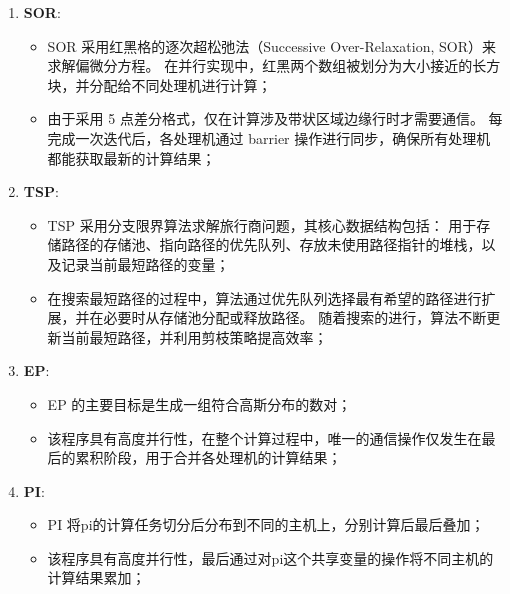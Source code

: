 {\begin{enumerate}[leftmargin=1em, align=left]
\begin{itemize}[leftmargin=*, nosep]
                  \item IS 是一个基于“桶排序”算法的整数排序程序。
                        它将 key 均匀分配到各个处理机，每个处理机维护一个私有“桶”，同时所有处理机共享一个公用“桶”；
                  \item 排序过程包括三个主要步骤：首先，每个处理机统计其私有“桶”中 key 的数量；
                        然后，在锁保护的临界区内，将这些计数累加到公用“桶”中；最后，根据公用“桶”中的信息构造出一个有序数组；
              \end{itemize}
        \item \textbf{SOR}:
              \begin{itemize}[leftmargin=*, nosep]
                  \item SOR 采用红黑格的逐次超松弛法（Successive Over-Relaxation, SOR）来求解偏微分方程。
                        在并行实现中，红黑两个数组被划分为大小接近的长方块，并分配给不同处理机进行计算；
                  \item 由于采用 5 点差分格式，仅在计算涉及带状区域边缘行时才需要通信。
                        每完成一次迭代后，各处理机通过 barrier 操作进行同步，确保所有处理机都能获取最新的计算结果；
              \end{itemize}
        \item \textbf{TSP}:
              \begin{itemize}[leftmargin=*, nosep]
                  \item TSP 采用分支限界算法求解旅行商问题，其核心数据结构包括：
                        用于存储路径的存储池、指向路径的优先队列、存放未使用路径指针的堆栈，以及记录当前最短路径的变量；
                  \item 在搜索最短路径的过程中，算法通过优先队列选择最有希望的路径进行扩展，并在必要时从存储池分配或释放路径。
                        随着搜索的进行，算法不断更新当前最短路径，并利用剪枝策略提高效率；
              \end{itemize}
        \item \textbf{EP}:
              \begin{itemize}[leftmargin=*, nosep]
                  \item EP 的主要目标是生成一组符合高斯分布的数对；
                  \item 该程序具有高度并行性，在整个计算过程中，唯一的通信操作仅发生在最后的累积阶段，用于合并各处理机的计算结果；
              \end{itemize}
        \item \textbf{PI}:
              \begin{itemize}[leftmargin=*, nosep]
                  \item PI 将pi的计算任务切分后分布到不同的主机上，分别计算后最后叠加；
                  \item 该程序具有高度并行性，最后通过对pi这个共享变量的操作将不同主机的计算结果累加；
              \end{itemize}
    \end{enumerate}

}
